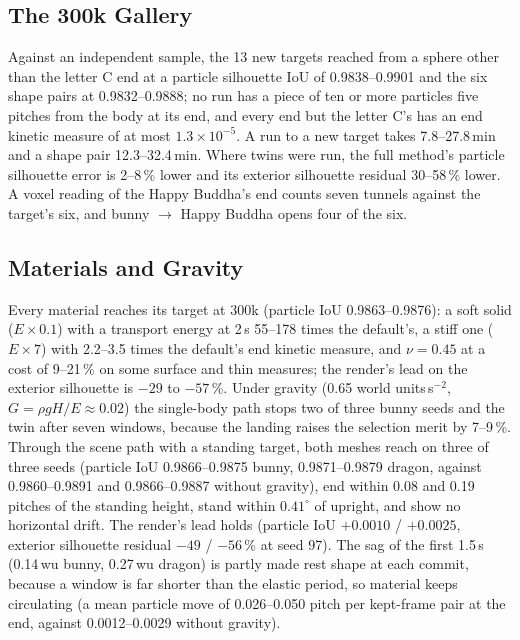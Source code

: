 \subsection{The 300k Gallery}
Against an independent sample, the 13 new targets reached from a sphere other than the letter C end at a particle silhouette
IoU of 0.9838--0.9901 and the six shape pairs at 0.9832--0.9888; no run has a piece of ten or more particles five pitches from
the body at its end, and every end but the letter C's has an end kinetic measure of at most $1.3\times10^{-5}$. A run to a new
target takes 7.8--27.8\,min and a shape pair 12.3--32.4\,min. Where twins were run, the full method's particle silhouette
error is 2--8\,\% lower and its exterior silhouette residual 30--58\,\% lower. A voxel reading of the Happy Buddha's end counts
seven tunnels against the target's six, and bunny $\to$ Happy Buddha opens four of the six.

\subsection{Materials and Gravity}
\label{app:ch4_gravity}
Every material reaches its target at 300k (particle IoU 0.9863--0.9876): a soft solid ($E\times0.1$) with a transport energy at
2\,s 55--178 times the default's, a stiff one ($E\times7$) with 2.2--3.5 times the default's end kinetic measure, and
$\nu=0.45$ at a cost of 9--21\,\% on some surface and thin measures; the render's lead on the exterior silhouette is $-29$ to
$-57$\,\%. Under gravity (0.65 world units\,s$^{-2}$, $G=\rho gH/E\approx0.02$) the single-body path stops two of three bunny
seeds and the twin after seven windows, because the landing raises the selection merit by 7--9\,\%. Through the scene path with a
standing target, both meshes reach on three of three seeds (particle IoU 0.9866--0.9875 bunny, 0.9871--0.9879 dragon, against
0.9860--0.9891 and 0.9866--0.9887 without gravity), end within 0.08 and 0.19 pitches of the standing height, stand within
$0.41^\circ$ of upright, and show no horizontal drift. The render's lead holds (particle IoU $+0.0010$ / $+0.0025$, exterior
silhouette residual $-49$ / $-56$\,\% at seed 97). The sag of the first 1.5\,s (0.14\,wu bunny, 0.27\,wu dragon) is partly made
rest shape at each commit, because a window is far shorter than the elastic period, so material keeps circulating (a mean particle
move of 0.026--0.050 pitch per kept-frame pair at the end, against 0.0012--0.0029 without gravity).

